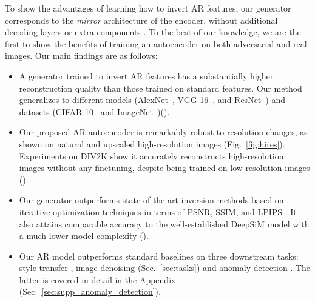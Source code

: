 To show the advantages of learning how to invert AR features, our generator corresponds to the \emph{mirror} architecture of the encoder, without additional decoding layers \cite{bigbigan,shocher_2020_semantic} or extra components \cite{razavi2019generating,esser2021taming,rombach2022invertible,esser2021imagebart,van2017neural}. To the best of our knowledge, we are the first to show the benefits of training an autoencoder on both adversarial and real images. Our main findings are as follows:

\begin{itemize}
    \item A generator trained to invert AR features has a substantially higher reconstruction quality than those trained on standard features. 
    Our method generalizes to different models (AlexNet~\cite{krizhevsky_2012_imagenet}, VGG-16~\cite{simonyan_2014_very}, and ResNet~\cite{he_2016_deep}) and datasets (CIFAR-10~\cite{krizhevsky_2009_learning} and ImageNet~\cite{russakovsky_2015_imagenet})().
    \item Our proposed AR autoencoder is remarkably robust to resolution changes, as shown on natural and upscaled high-resolution images (Fig.~\ref{fig:hires}). Experiments on DIV2K \cite{agustsson_2017_ntire} show it accurately reconstructs high-resolution images without any finetuning, despite being trained on low-resolution images ().
    \item  Our generator outperforms state-of-the-art inversion methods based on iterative optimization techniques \cite{engstrom_2019_adversarial} in terms of PSNR, SSIM, and LPIPS \cite{zhang_2018_unreasonable}. It also attains comparable accuracy to the well-established DeepSiM model \cite{dosovitskiy_2015_inverting} with a much lower model complexity ().
    \item Our AR model outperforms standard baselines on three downstream tasks: style transfer \cite{li_2017_universal}, image denoising \cite{nguyen2017plug} (Sec.~\ref{sec:tasks}) and anomaly detection  \cite{deecke_2018_image}. The latter is covered in detail in the Appendix (Sec.~\ref{sec:supp_anomaly_detection}).
\end{itemize}
